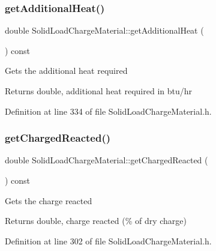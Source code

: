 \subsubsection{\texorpdfstring{get\+Additional\+Heat()}{getAdditionalHeat()}\hspace{0.1cm}{\footnotesize\ttfamily [3/3]}}
{\footnotesize\ttfamily double Solid\+Load\+Charge\+Material\+::get\+Additional\+Heat (\begin{DoxyParamCaption}{ }\end{DoxyParamCaption}) const\hspace{0.3cm}{\ttfamily [inline]}}

Gets the additional heat required \begin{DoxyReturn}{Returns}
double, additional heat required in btu/hr 
\end{DoxyReturn}


Definition at line 334 of file Solid\+Load\+Charge\+Material.\+h.

\mbox{\label{class_solid_load_charge_material_a7c7f05b6ee14eb5f07e5c48c30e9c7a1}} 
\subsubsection{\texorpdfstring{get\+Charged\+Reacted()}{getChargedReacted()}\hspace{0.1cm}{\footnotesize\ttfamily [1/3]}}
{\footnotesize\ttfamily double Solid\+Load\+Charge\+Material\+::get\+Charged\+Reacted (\begin{DoxyParamCaption}{ }\end{DoxyParamCaption}) const\hspace{0.3cm}{\ttfamily [inline]}}

Gets the charge reacted \begin{DoxyReturn}{Returns}
double, charge reacted (\% of dry charge) 
\end{DoxyReturn}


Definition at line 302 of file Solid\+Load\+Charge\+Material.\+h.

\mbox{\label{class_solid_load_charge_material_a7c7f05b6ee14eb5f07e5c48c30e9c7a1}} 
